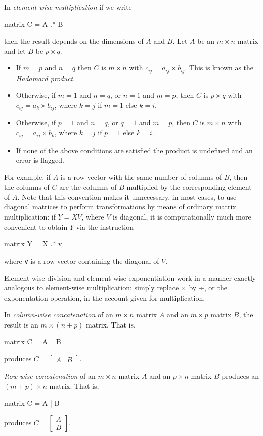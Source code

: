 In \textit{element-wise multiplication} if we write
%
\begin{code}
matrix C = A .* B
\end{code}
% 
then the result depends on the dimensions of $A$ and $B$.  Let $A$ be
an $m \times n$ matrix and let $B$ be $p \times q$.  
%
\begin{itemize}
\item If $m=p$ and $n=q$ then $C$ is $m\times n$ with $c_{ij} = a_{ij}
  \times b_{ij}$.  This is known as the \emph{Hadamard product}.
\item Otherwise, if $m=1$ and $n=q$, or $n=1$ and $m=p$, then $C$ is
  $p\times q$ with $c_{ij} = a_k \times b_{ij}$, where $k=j$ if $m=1$
  else $k=i$.
\item Otherwise, if $p=1$ and $n=q$, or $q=1$ and $m=p$, then $C$ is
  $m\times n$ with $c_{ij} = a_{ij} \times b_k$, where $k=j$ if $p=1$
  else $k=i$.
\item If none of the above conditions are satisfied the product is
  undefined and an error is flagged.
\end{itemize}
For example, if $A$ is a row vector with the same number of
columns of $B$, then the columns of $C$ are the columns of $B$
multiplied by the corresponding element of $A$.  Note that this
convention makes it unnecessary, in most cases, to use diagonal
matrices to perform transformations by means of ordinary matrix
multiplication: if $Y = XV$, where $V$ is diagonal, it is
computationally much more convenient to obtain $Y$ via the
instruction
%
\begin{code}
matrix Y = X .* v
\end{code}
%
where \texttt{v} is a row vector containing the diagonal of $V$.

Element-wise division and element-wise exponentiation work in a manner
exactly analogous to element-wise multiplication: simply replace
$\times$ by $\div$, or the exponentation operation, in the account
given for multiplication.

In \textit{column-wise concatenation} of an $m\times n$ matrix $A$ and
an $m\times p$ matrix $B$, the result is an $m\times (n+p)$ matrix.
That is,
%
\begin{code}
matrix C = A ~ B
\end{code}
% 
produces $C = \left[ \begin{array}{cc} A & B \end{array} \right]$.

\textit{Row-wise concatenation} of an $m\times n$ matrix $A$ and
an $p\times n$ matrix $B$ produces an $(m+p) \times n$ matrix.
That is,
%
\begin{code}
matrix C = A | B
\end{code}
% 
produces $C = \left[ \begin{array}{cc} A \\ B \end{array} \right]$.

